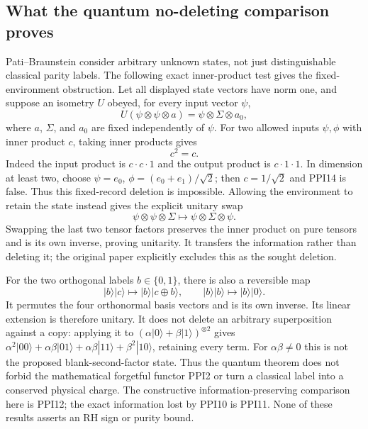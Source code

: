 \subsection{What the quantum no-deleting comparison proves}
Pati--Braunstein consider arbitrary unknown states, not just
distinguishable classical parity labels. The following exact
inner-product test gives the fixed-environment obstruction.
Let all displayed state vectors have norm one, and suppose an
isometry $U$ obeyed, for every input vector $\psi$,
\begin{equation}\tag{PPI13}
U(\psi\otimes\psi\otimes a)
=\psi\otimes\Sigma\otimes a_0,
\end{equation}
where $a$, $\Sigma$, and $a_0$ are fixed independently of $\psi$.
For two allowed inputs $\psi,\phi$ with inner product $c$, taking
inner products gives
\begin{equation}\tag{PPI14}
c^2=c.
\end{equation}
Indeed the input product is $c\cdot c\cdot1$ and the output
product is $c\cdot1\cdot1$. In dimension at least two, choose
$\psi=e_0$, $\phi=(e_0+e_1)/\sqrt2$; then $c=1/\sqrt2$ and
PPI14 is false. Thus this fixed-record deletion is impossible.
Allowing the environment to retain the state instead gives the
explicit unitary swap
\begin{equation}\tag{PPI15}
\psi\otimes\psi\otimes\Sigma
\longmapsto\psi\otimes\Sigma\otimes\psi.
\end{equation}
Swapping the last two tensor factors preserves the inner product
on pure tensors and is its own inverse, proving unitarity. It
transfers the information rather than deleting it; the original
paper explicitly excludes this as the sought deletion.

For the two orthogonal labels $b\in\{0,1\}$, there is also a
reversible map
\begin{equation}\tag{PPI16}
|b\rangle|c\rangle\longmapsto
|b\rangle|c\mathbin{\oplus}b\rangle,
\qquad |b\rangle|b\rangle\longmapsto|b\rangle|0\rangle.
\end{equation}
It permutes the four orthonormal basis vectors and is its own
inverse. Its linear extension is therefore unitary. It does not
delete an arbitrary superposition against a copy: applying it
to $(\alpha|0\rangle+\beta|1\rangle)^{\otimes2}$ gives
$\alpha^2|00\rangle+\alpha\beta|01\rangle+
\alpha\beta|11\rangle+\beta^2|10\rangle$, retaining every term.
For $\alpha\beta\ne0$ this is not the proposed blank-second-factor
state. Thus the quantum theorem does not forbid the mathematical
forgetful functor PPI2 or turn a classical label into a conserved
physical charge. The constructive information-preserving
comparison here is PPI12; the exact information lost by PPI10 is
PPI11. None of these results asserts an RH sign or purity bound.
